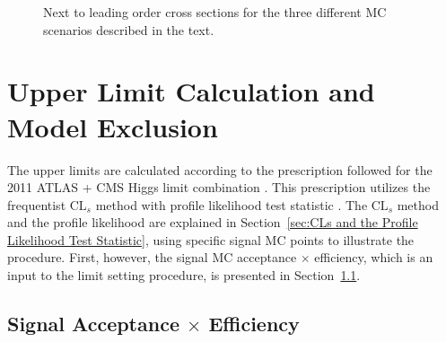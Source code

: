 \documentclass[dissertation.tex]{subfiles}
\begin{document}
\begin{figure}
	\caption{Next to leading order cross sections for the three different MC scenarios described in the text.}
	\label{fig:sig_xsec}
\end{figure}

\section{Upper Limit Calculation and Model Exclusion}
\label{sec:Upper Limit Calculation and Model Exclusion}

The upper limits are calculated according to the prescription followed for the 2011 ATLAS + CMS Higgs limit combination \cite{CMS-NOTE-2011/005}.  This prescription utilizes the frequentist $\mbox{CL}_{s}$ method \cite{Read} with profile likelihood test statistic \cite{Cowan_Cranmer_Gross_Vitells}.  The $\mbox{CL}_{s}$ method and the profile likelihood are explained in Section~\ref{sec:CLs and the Profile Likelihood Test Statistic}, using specific signal MC points to illustrate the procedure.  First, however, the signal MC acceptance $\times$ efficiency, which is an input to the limit setting procedure, is presented in Section~\ref{sec:Signal Acceptance Times Efficiency}.

\subsection{Signal Acceptance $\times$ Efficiency}
\label{sec:Signal Acceptance Times Efficiency}
\end{document}

